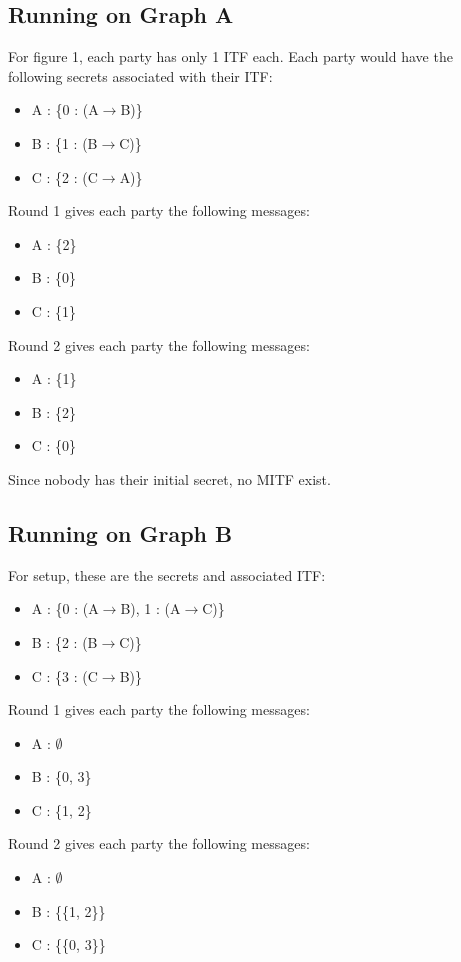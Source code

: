 \documentclass[conference]{IEEEtran}
\begin{document}
\subsection{Running on Graph A}
For figure 1, each party has only 1 ITF each. Each party would have the following secrets associated with their ITF:
\begin{itemize}
\item A : \{0 : (A$\rightarrow$B)\}
\item B : \{1 : (B$\rightarrow$C)\}
\item C : \{2 : (C$\rightarrow$A)\}
\end{itemize}

Round 1 gives each party the following messages:
\begin{itemize}
\item A : \{2\}
\item B : \{0\}
\item C : \{1\}
\end{itemize}

Round 2 gives each party the following messages:
\begin{itemize}
\item A : \{1\}
\item B : \{2\}
\item C : \{0\}
\end{itemize}

Since nobody has their initial secret, no MITF exist.

\subsection{Running on Graph B}
For setup, these are the secrets and associated ITF:
\begin{itemize}
\item A : \{0 : (A$\rightarrow$B), 1 : (A$\rightarrow$C)\}
\item B : \{2 : (B$\rightarrow$C)\}
\item C : \{3 : (C$\rightarrow$B)\}
\end{itemize}

Round 1 gives each party the following messages:
\begin{itemize}
\item A : $\emptyset$
\item B : \{0, 3\}
\item C : \{1, 2\}
\end{itemize}

Round 2 gives each party the following messages:
\begin{itemize}
\item A : $\emptyset$
\item B : \{\{1, 2\}\}
\item C : \{\{0, 3\}\}
\end{itemize}
\end{document}
